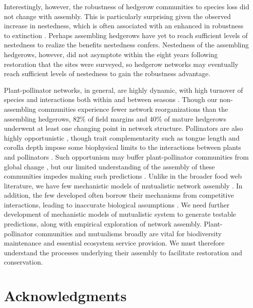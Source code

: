 \documentclass[12pt]{article}
\begin{document}
Interestingly, however, the robustness of hedgerow communities to
species loss did not change with assembly. This is particularly
surprising given the observed increase in nestedness, which is often
associated with an enhanced in robustness to extinction
\citep{Memmott2004}. Perhaps assembling hedgerows have yet to reach sufficient
levels of nestedness to realize the benefits nestedness
confers. Nestedness of the assembling hedgerows, however, did not
asymptote within the eight years following restoration that the sites
were surveyed, so hedgerow networks may eventually reach sufficient
levels of nestedness to gain the robustness advantage.

Plant-pollinator networks, in general, are highly dynamic, with high
turnover of species and interactions both within and between seasons
\citep{Burkle2011}. Though our non-assembling communities experience
fewer network reorganizations than the assembling hedgerows, $82\%$ of
field margins and $40\%$ of mature hedgerows underwent at least one
changing point in network structure. Pollinators are also highly
opportunistic \citep{petanidou-2008-564, Vazquez2005b,
  albrecht2010plant}, though trait complementarity such as tongue
length and corolla depth impose some biophysical limits to the
interactions between plants and pollinators
\citep{Vazquez2009evaluating, Vazquez2009, Stang2009, Stang2006,
  Santamaria2007}. Such opportunism may buffer plant-pollinator
communities from global change \citep[e.g.,][]{ramos2012topological,
  kaiser2010robustness}, but our limited understanding of the assembly
of these communities impedes making such predictions
\citep{Vazquez2009, Burkle2011}. Unlike in the broader food web
literature, we have few mechanistic models of mutualistic network
assembly \citep{valdovinos2013adaptive}. In addition, the few
developed often borrow their mechanisms from competitive interactions,
leading to inaccurate biological assumptions
\citep{holland2006comment}. We need further development of mechanistic
models of mutualistic system to generate testable predictions, along
with empirical exploration of network assembly. Plant-pollinator
communities and mutualisms broadly are vital for biodiversity
maintenance and essential ecosystem service provision. We must
therefore understand the processes underlying their assembly to
facilitate restoration and conservation.


\section*{Acknowledgments}
\label{sec:acknowledge}
\end{document}
